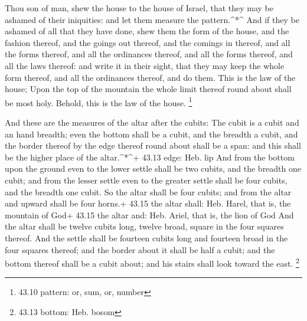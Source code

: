  Thou son of man, shew the house to the house of Israel,
that they may be ashamed of their iniquities: and let them measure the
pattern.\^{}*\^{}  And if they be ashamed of all that they
have done, shew them the form of the house, and the fashion thereof, and
the goings out thereof, and the comings in thereof, and all the forms
thereof, and all the ordinances thereof, and all the forms thereof, and
all the laws thereof: and write it in their sight, that they may keep
the whole form thereof, and all the ordinances thereof, and do them.
 This is the law of the house; Upon the top of the mountain
the whole limit thereof round about shall be most holy. Behold, this is
the law of the house. \footnote{43.10 pattern: or, sum, or, number}

 And these are the measures of the altar after the cubits:
The cubit is a cubit and an hand breadth; even the bottom shall be a
cubit, and the breadth a cubit, and the border thereof by the edge
thereof round about shall be a span: and this shall be the higher place
of the altar.\^{}*\^{}+ 43.13 edge: Heb. lip  And from the
bottom upon the ground even to the lower settle shall be two cubits, and
the breadth one cubit; and from the lesser settle even to the greater
settle shall be four cubits, and the breadth one cubit.  So
the altar shall be four cubits; and from the altar and upward shall be
four horns.+ 43.15 the altar shall: Heb. Harel, that is, the mountain of
God+ 43.15 the altar and: Heb. Ariel, that is, the lion of God
 And the altar shall be twelve cubits long, twelve broad,
square in the four squares thereof.  And the settle shall
be fourteen cubits long and fourteen broad in the four squares thereof;
and the border about it shall be half a cubit; and the bottom thereof
shall be a cubit about; and his stairs shall look toward the east.
\footnote{43.13 bottom: Heb. bosom}

